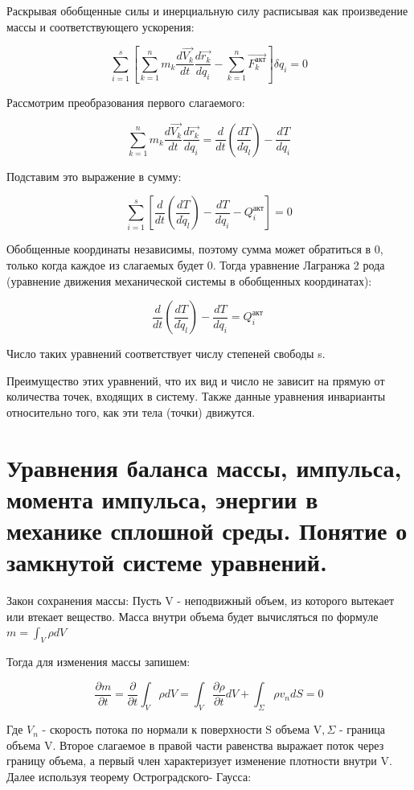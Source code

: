 Раскрывая обобщенные силы и инерциальную силу расписывая как произведение массы и соответствующего ускорения:

$$
\sum_{i=1}^{s}\left[\sum_{k=1}^{n} m_{k} \frac{d \overrightarrow{V_{k}}}{d t} \frac{d \overrightarrow{r_{k}}}{d q_{i}}-\sum_{k=1}^{n} \overrightarrow{F_{k}^{\text{акт}}}\right] \delta q_{i}=0
$$

Рассмотрим преобразования первого слагаемого:

$$\sum_{k=1}^{n} m_{k} \frac{d \overrightarrow{V_{k}}}{d t} \frac{d \overrightarrow{r_{k}}}{d q_{i}}=\frac{d}{d t}\left(\frac{d T}{d \dot{q}_{l}}\right)-\frac{d T}{d q_{i}}$$

Подставим это выражение в сумму:

$$
\sum_{i=1}^{s}\left[\frac{d}{d t}\left(\frac{d T}{d \dot{q}_{l}}\right)-\frac{d T}{d q_{i}}-Q_{i}^{\text{акт}}\right]=0
$$

Обобщенные координаты независимы, поэтому сумма может обратиться в 0, только когда каждое из слагаемых будет 0. Тогда уравнение Лагранжа 2 рода (уравнение движения механической системы в обобщенных координатах):

$$
\frac{d}{d t}\left(\frac{d T}{d \dot{q}_{l}}\right)-\frac{d T}{d q_{i}}=Q_{i}^{\text {акт }}
$$

Число таких уравнений соответствует числу степеней свободы s.


Преимущество этих уравнений, что их вид и число не зависит на прямую от количества точек, входящих в систему. Также данные уравнения инварианты относительно того, как эти тела (точки) движутся.


\section{Уравнения баланса массы, импульса, момента импульса, энергии в механике сплошной среды. Понятие о замкнутой системе уравнений.}
Закон сохранения массы: Пусть V - неподвижный объем, из которого вытекает или втекает вещество. Масса внутри объема будет вычисляться по формуле $m=\int_{V} \rho d V$

Тогда для изменения массы запишем:

$$
\frac{\partial m}{\partial t}=\frac{\partial}{\partial t} \int_{V} \rho d V=\int_{V} \frac{\partial \rho}{\partial t} d V+\int_{\Sigma} \rho v_{n} d S=0
$$

Где $V_n$ - скорость потока по нормали к поверхности $\mathrm{S}$ объема $\mathrm{V}, \Sigma$ - граница объема $\mathrm{V}$. Второе слагаемое в правой части равенства выражает поток через границу объема, а первый член характеризует изменение плотности внутри V. Далее используя теорему Остроградского- Гаусса:

